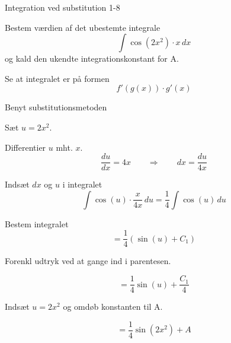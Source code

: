 \documentclass{article}
\begin{document}
\begin{exercise}{Integration ved substitution 1-8}
	
	
	Bestem værdien af det ubestemte integrale
	\[
	\int \cos(2x^2) \cdot x \, dx
	\]
	og kald den ukendte integrationskonstant for A.
	
	
	
	
	\hint
	
	Se at integralet er på formen
	\[
	f'(g(x)) \cdot g'(x)
	\]
	
	\hint
	
	Benyt substitutionsmetoden
	
	\hint
	
	Sæt $u=2x^2$.
	
	
	\hint
	
	Differentier $u$ mht. $x$.
	\[
	\frac{du}{dx} = 4x \qquad	\Rightarrow \qquad dx = \frac{du}{4x}
	\]
	
	\hint
	
	Indsæt $dx$ og $u$ i integralet
	\[
	\int \cos(u) \cdot \frac{x}{4x} \, du = \frac{1}{4} \int \cos(u) \, du
	\]
	
	\hint
	
	Bestem integralet
	\[
	= \frac{1}{4} \left( \sin(u) + C_1 \right)
	\]
	
	\hint
	Forenkl udtryk ved at gange ind i parentesen.
	
	\hint
	
	\[
	= \frac{1}{4} \sin(u) + \frac{C_1}{4}
	\]
	
	\hint
	
	Indsæt $u = 2x^2$ og omdøb konstanten  til A.
	
	\hint
	
	\[
	= \frac{1}{4} \sin(2x^2) + A
	\]
	
	
\end{exercise}
\end{document}
